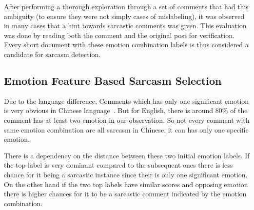\documentclass[12pt,a4paper]{report}
\theoremstyle{definition}
\begin{document}
\begin{CJK}{UTF8}{bsmi}
\begin{itemize}
    \end{itemize}
    \par After performing a thorough exploration through a set of comments that had this ambiguity (to ensure they were not simply cases of mislabeling), it was observed in many cases that a hint towards sarcastic comments was given. This evaluation was done by reading both the comment and the original post for verification. Every short document with these emotion combination labels is thus considered a candidate for sarcasm detection.
    \subsection{Emotion Feature Based Sarcasm Selection}
    \par Due to the language difference, Comments which has only one significant emotion is very obvious in Chinese language~\cite{quan2010emotion}. But for English, there is around 80\% of the comment has at least two emotion in our observation. So not every comment with same emotion combination are all sarcasm in Chinese, it can has only one specific emotion. 
    \par There is a dependency on the distance between these two initial emotion labels. If the top label is very dominant compared to the subsequent ones there is less chance for it being a sarcastic instance since their is only one significant emotion. On the other hand if the two top labels have similar scores and opposing emotion there is higher chances for it to be a sarcastic comment indicated by the emotion combination.


\end{CJK}
\end{document}
